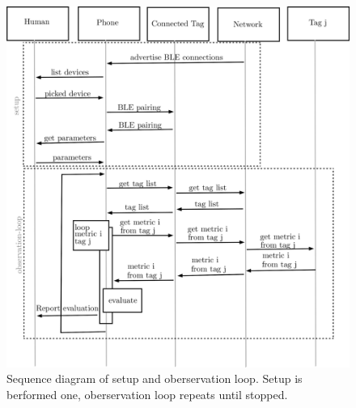 \begin{figure}[ht!]
	\includegraphics[width=\linewidth]{graphics/schematics/obervation_loop.png}
	\caption{Sequence diagram of setup and oberservation loop. Setup is berformed one, oberservation loop repeats until stopped.}
	\label{f:observation_loop}
\end{figure}

